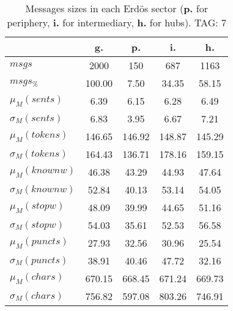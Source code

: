 \begin{table}[h!]
\begin{center}
\begin{tabular}{| l | c | c | c | c |}\hline
 & g. & p. & i. & h. \\\hline
$msgs$ & 2000  & 150  & 687  & 1163 \\\hline
$msgs_{\%}$ & 100.00  & 7.50  & 34.35  & 58.15 \\\hline
$\mu_M(sents)$ & 6.39  & 6.15  & 6.28  & 6.49 \\\hline
$\sigma_M(sents)$ & 6.83  & 3.95  & 6.67  & 7.21 \\\hline
$\mu_M(tokens)$ & 146.65  & 146.92  & 148.87  & 145.29 \\\hline
$\sigma_M(tokens)$ & 164.43  & 136.71  & 178.16  & 159.15 \\\hline
$\mu_M(knownw)$ & 46.38  & 43.29  & 44.93  & 47.64 \\\hline
$\sigma_M(knownw)$ & 52.84  & 40.13  & 53.14  & 54.05 \\\hline
$\mu_M(stopw)$ & 48.09  & 39.99  & 44.65  & 51.16 \\\hline
$\sigma_M(stopw)$ & 54.03  & 35.61  & 52.53  & 56.58 \\\hline
$\mu_M(puncts)$ & 27.93  & 32.56  & 30.96  & 25.54 \\\hline
$\sigma_M(puncts)$ & 38.91  & 40.46  & 47.72  & 32.16 \\\hline
$\mu_M(chars)$ & 670.15  & 668.45  & 671.24  & 669.73 \\\hline
$\sigma_M(chars)$ & 756.82  & 597.08  & 803.26  & 746.91 \\\hline
\end{tabular}
\caption{Messages sizes in each Erd\"os sector ({{\bf p.}} for periphery, {{\bf i.}} for intermediary, {{\bf h.}} for hubs). TAG: 7}
\end{center}
\end{table}